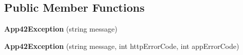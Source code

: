 \subsection*{Public Member Functions}
\begin{DoxyCompactItemize}
\item 
\hypertarget{classcom_1_1shephertz_1_1app42_1_1paas_1_1sdk_1_1csharp_1_1_app42_exception_af9101eb6189b370465d1c9da85279b84}{{\bfseries App42\+Exception} (string message)}\label{classcom_1_1shephertz_1_1app42_1_1paas_1_1sdk_1_1csharp_1_1_app42_exception_af9101eb6189b370465d1c9da85279b84}

\item 
\hypertarget{classcom_1_1shephertz_1_1app42_1_1paas_1_1sdk_1_1csharp_1_1_app42_exception_a9779435d3075f18cda70d17a0597fbf4}{{\bfseries App42\+Exception} (string message, int http\+Error\+Code, int app\+Error\+Code)}\label{classcom_1_1shephertz_1_1app42_1_1paas_1_1sdk_1_1csharp_1_1_app42_exception_a9779435d3075f18cda70d17a0597fbf4}


\end{DoxyCompactItemize}
